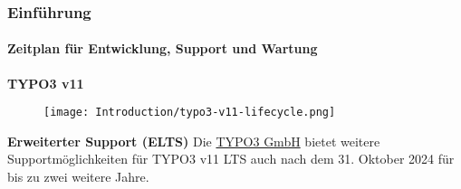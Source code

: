 %

\begin{frame}[fragile]
	\frametitle{Einführung}
	\framesubtitle{Zeitplan für Entwicklung, Support und Wartung}

	\textbf{TYPO3 v11}

	\begin{figure}
		\texttt{[image: Introduction/typo3-v11-lifecycle.png]}
	\end{figure}

	\textbf{Erweiterter Support (ELTS)}\newline
	\smaller
		Die \href{https://typo3.com}{TYPO3 GmbH} bietet weitere Supportmöglichkeiten
		für TYPO3 v11 LTS auch nach dem 31. Oktober 2024 für bis zu zwei weitere
		Jahre.
	\normalsize

\end{frame}

